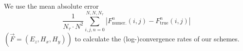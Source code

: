 \documentclass[12pt,reqno]{amsart}
\theoremstyle{definition}
\numberwithin{equation}{section}
\begin{document}
	
	We use the mean absolute error 
	$$
	\frac{1}{N_{\tau}\cdot N^2}\sum_{i,j,n=0}^{N,N,N_{\tau}}\left | F^n_{\mathrm{numer.}}(i,j)-F_{\mathrm{true}}^n(i,j) \right|
	$$
	$(\vec{F}=(E_z,H_x,H_y))$ to calculate the (log-)convergence rates of our schemes.
		
\end{document}
